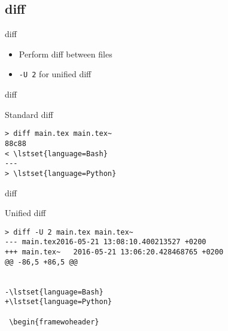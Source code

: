 \subsection{diff}

\begin{frame}[fragile]{diff}
  \begin{itemize}
    \pause \item Perform diff between files
    \pause \item \texttt{-U 2} for unified diff
  \end{itemize}
\end{frame}

\begin{frame}[fragile]{diff}
  \begin{exampleblock}{Standard diff}
    \begin{lstlisting}[showstringspaces=false,basicstyle=\tiny]
> diff main.tex main.tex~
88c88
< \lstset{language=Bash}
---
> \lstset{language=Python}
    \end{lstlisting}
  \end{exampleblock}
\end{frame}

\begin{frame}[fragile]{diff}
  \begin{exampleblock}{Unified diff}
    \begin{lstlisting}[showstringspaces=false,basicstyle=\tiny]
> diff -U 2 main.tex main.tex~
--- main.tex2016-05-21 13:08:10.400213527 +0200
+++ main.tex~   2016-05-21 13:06:20.428468765 +0200
@@ -86,5 +86,5 @@
 
 
-\lstset{language=Bash}
+\lstset{language=Python}
 
 \begin{framewoheader}
    \end{lstlisting}
  \end{exampleblock}
\end{frame}
